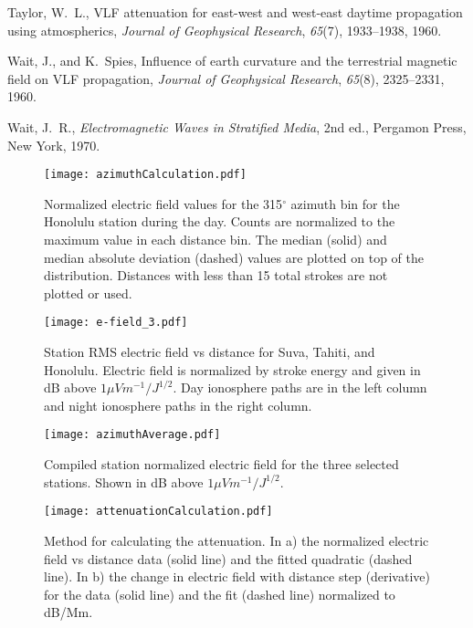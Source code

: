 \documentclass[draft,jgrga]{AGUTeX}
\begin{document}
\begin{article}
\begin{thebibliography}{12}
Taylor, W.~L., {VLF attenuation for east-west and west-east daytime propagation
  using atmospherics}, \textit{Journal of Geophysical Research},
  \textit{65}(7), 1933--1938, 1960.

Wait, J., and K.~Spies, {Influence of earth curvature and the terrestrial
  magnetic field on VLF propagation}, \textit{Journal of Geophysical Research},
  \textit{65}(8), 2325--2331, 1960.

Wait, J.~R., \textit{{Electromagnetic Waves in Stratified Media}}, 2nd ed.,
  Pergamon Press, New York, 1970.
  
\end{thebibliography}

 \end{article}
 
 \begin{figure}[h!t]
   \centering
   \texttt{[image: azimuthCalculation.pdf]} 
   \caption{Normalized electric field values for the 315$^\circ$ azimuth bin for the Honolulu station during the day.
   	Counts are normalized to the maximum value in each distance bin.
	The median (solid) and median absolute deviation (dashed) values are plotted on top of the distribution.
	Distances with less than 15 total strokes are not plotted or used.}
   \label{azimuthCalculation}
\end{figure}
 
 \begin{figure}[h!t]
   \centering
   \texttt{[image: e-field\_3.pdf]} 
   \caption{Station RMS electric field vs distance for Suva, Tahiti, and Honolulu.
   	Electric field is normalized by stroke energy and given in dB above $1 \mu Vm^{-1}/J^{1/2}$.
	Day ionosphere paths are in the left column and night ionosphere paths in the right column.}
   \label{azimuth}
\end{figure}
  
\begin{figure}[h!t]
    \centering
    \texttt{[image: azimuthAverage.pdf]} 
    \caption{Compiled station normalized electric field for the three selected stations.
    	Shown in dB above $1 \mu Vm^{-1}/J^{1/2}$.}
    \label{azimuthAverage}
 \end{figure}
 
\begin{figure}[h!t]
    \centering
    \texttt{[image: attenuationCalculation.pdf]} 
    \caption{Method for calculating the attenuation.
    	In a) the normalized electric field vs distance data (solid line) and the fitted quadratic (dashed line).
	In b) the change in electric field with distance step (derivative) for the data (solid line) and the fit (dashed line) normalized to dB/Mm.}
    \label{attenuationCalculation}
 \end{figure}
  
\end{document}

